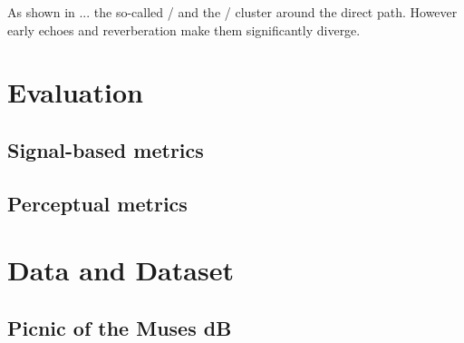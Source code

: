 As shown in ... the so-called \ILD/ and the \IPD/ cluster around the direct path. However early echoes and
reverberation make them significantly diverge.


\section{Evaluation}\label{sec:evaluation}

\subsection{Signal-based metrics}
\subsection{Perceptual metrics}


\section{Data and Dataset}

\subsection{Picnic of the Muses dB}

\subsection{\dechorate}